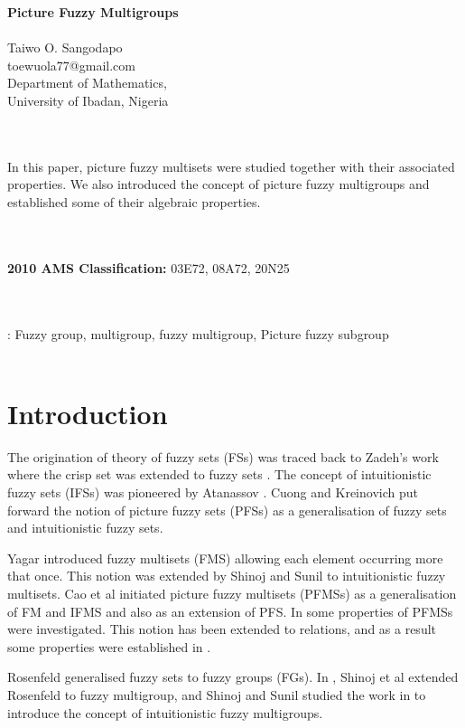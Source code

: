 \documentclass[12pt,letterpaper]{amsart}
\theoremstyle{plain}
\theoremstyle{definition}
\numberwithin{equation}{section}
\begin{document}
\begin{center}
{\textbf{{Picture Fuzzy Multigroups}}}\ \\ \ \\

{Taiwo O. Sangodapo \\ toewuola77@gmail.com\\
Department of Mathematics,\\ University of Ibadan, Nigeria}
\end{center}
\ \\ \  \\


In this paper, picture fuzzy multisets were studied together with their associated properties. We also introduced the concept of picture fuzzy multigroups and established some of their algebraic properties.

\ \\ \ \\

\noindent \textbf{2010 AMS Classification:} 03E72, 08A72, 20N25

\ \\ \ \\
: Fuzzy group, multigroup, fuzzy multigroup, Picture fuzzy subgroup
\ \\ \ \\

\section{Introduction}
The origination of theory of fuzzy sets (FSs) was traced back to Zadeh's work where the crisp set was extended to fuzzy sets \cite{z}. The concept of intuitionistic fuzzy sets (IFSs) was pioneered by Atanassov \cite{a1}.
Cuong and Kreinovich \cite{ck} put forward the notion of picture fuzzy sets (PFSs) as a generalisation of fuzzy sets and intuitionistic fuzzy sets.

Yagar \cite{y} introduced fuzzy multisets (FMS) allowing each element occurring more that once. This notion was extended \cite{s} by Shinoj and Sunil to intuitionistic fuzzy multisets. Cao et al \cite{cfs} initiated picture fuzzy multisets (PFMSs) as a generalisation of FM and IFMS and also as an extension of PFS. In \cite{t1, ts} some properties of PFMSs were investigated. This notion has been extended to relations, and as a result some properties were established in \cite{t2, t3}. 

Rosenfeld \cite{r} generalised fuzzy sets to fuzzy groups (FGs). In \cite{s1}, Shinoj et al extended Rosenfeld to fuzzy multigroup, and Shinoj and Sunil \cite{s2} studied the work in \cite{s1} to introduce the concept of intuitionistic fuzzy multigroups. 
 
\end{document}
